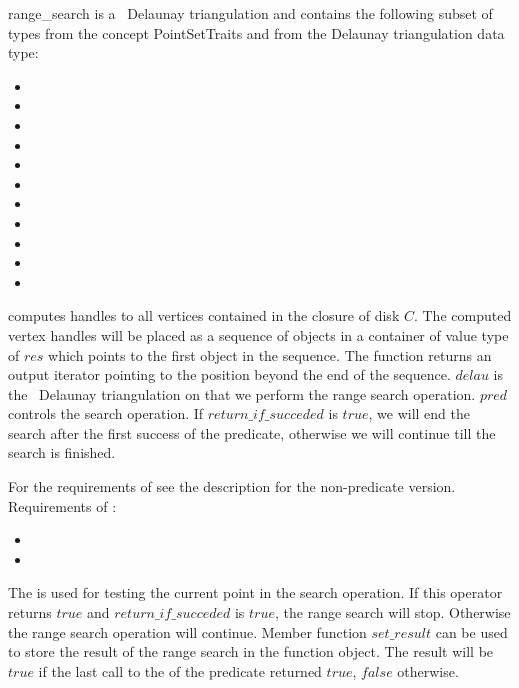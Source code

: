 \begin{ccRefFunction}{range_search}
 is a \cgal\ Delaunay triangulation and contains the following subset of types from the concept PointSetTraits and from
the Delaunay triangulation data type:
\begin{itemize}
  \item {} 
  \item {}
  \item {} 
  \item {}   
  \item {} 
  \item {}  
  \item {}  
  \item {} 
  \item {} 
  \item {} 
  \item {}  
\end{itemize}


{ computes handles to all vertices contained in the closure of disk $C$.
The computed vertex handles will be placed as a sequence of objects in a container of value type
of $res$
which points to the first object in the sequence. The function
returns an output iterator pointing to the position beyond the end
of the sequence.
$delau$ is the \cgal\ Delaunay triangulation on that we perform the range search operation.
$pred$ controls the search operation. If $return\_if\_succeded$ is $true$, we will end the search
after the first success of the predicate, otherwise we will continue till the search is finished.}

For the requirements of  see the description for the non-predicate version.\\
Requirements of :
\begin{itemize}
  \item {}
  \item {}
\end{itemize}
The  is used for testing the current point in the search operation.
If this operator returns $true$ and $return\_if\_succeded$ is $true$, the range search will stop.
Otherwise the range search operation will continue. Member function  $set\_result$ can be used to
store the result of the range search in the function object. The result will be $true$ if the last
call to the   of the predicate returned $true$, $false$ otherwise.


\end{ccRefFunction}

